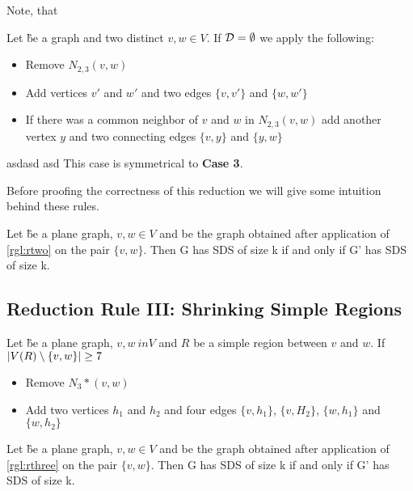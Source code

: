     Note, that 
\begin{rgl}\label{rgl:rtwo}
    Let \G be a graph and two distinct $v,w \in V$. If $\mathcal{D} = \emptyset$ we apply the following:
    \begin{caseof}

        \begin{itemize}
            \item Remove $N_{2,3}(v,w)$
            \item Add vertices $v'$ and $w'$ and two edges $\{v, v'\}$ and $\{w, w'\}$
            \item If there was a common neighbor of $v$ and $w$ in $N_{2,3}(v,w)$ add another vertex $y$ and two connecting edges  $\{v, y\}$ and $\{y, w\}$
        \end{itemize}
        asdasd
        asd
         This case is symmetrical to \textbf{Case 3}. 
    \end{caseof}
\end{rgl}

Before proofing the correctness of this reduction we will give some intuition behind these rules.

\begin{lemma}
    Let \G be a plane graph, $v, w \in V$ and \GB be the graph obtained after application of \cref{rgl:rtwo} on the pair $\{v, w\}$. Then G has SDS of size k if and only if G' has SDS of size k.
\end{lemma}

\subsection{Reduction Rule III: Shrinking Simple Regions}
\begin{rgl}\label{rgl:rthree}
    Let \G be a plane graph, $v, w \ in V$ and $R$ be a simple region between $v$ and $w$. If $\abs{V(R) \setminus \{v, w\}} \geq 7$

    \begin{itemize}
        \item Remove $N_3*(v,w)$
        \item Add two vertices $h_1$ and $h_2$ and four edges $\{v, h_1\}$, $\{v, H_2\}$, $\{w, h_1\}$ and $\{w, h_2\}$
    \end{itemize}
\end{rgl}
\begin{lemma}

    Let \G be a plane graph, $v, w \in V$ and \GB be the graph obtained after application of \cref{rgl:rthree} on the pair $\{v, w\}$. Then G has SDS of size k if and only if G' has SDS of size k.
\end{lemma}

